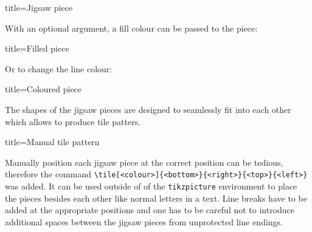 \documentclass[parskip=half]{scrartcl}
\begin{document}
\begin{tcblisting}{title={Jigsaw piece}}
\end{tcblisting}

With an optional argument, a fill colour can be passed to the piece:

\begin{tcblisting}{title={Filled piece}}
\end{tcblisting}

Or to change the line colour:

\begin{tcblisting}{title={Coloured piece}}
\end{tcblisting}

The shapes of the jigsaw pieces are designed to seamlessly fit into each other which allows to produce tile patters.

\begin{tcblisting}{title={Manual tile pattern}}
\end{tcblisting}

Manually position each jigsaw piece at the correct position can be tedious, therefore the command \lstinline|\tile[<colour>]{<bottom>}{<right>}{<top>}{<left>}| was added. It can be used outside of of the \lstinline|tikzpicture| environment to place the pieces besides each other like normal letters in a text. Line breaks have to be added at the appropriate positions and one has to be careful not to introduce additional spaces between the jigsaw pieces from unprotected line endings.
\end{document}
